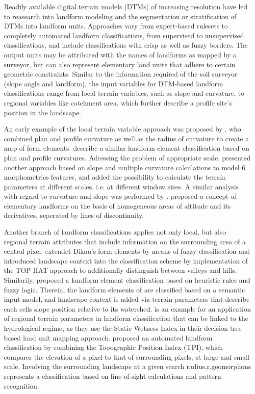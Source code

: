 \documentclass[final,1p,times,twocolumn,authoryear]{elsarticle}
\begin{document}
Readily available digital terrain models (DTMs) of increasing resolution have led to reasearch into landform modeling and the segmentation or stratification  of DTMs into landform units. Approaches vary from expert-based rulesets to completely automated landform classifications, from supervised to unsupervised classifications, and include classifications with crisp as well as fuzzy borders.  The output units may be attributed with the names of landforms as mapped by a surveyor, but can also represent elementary land units that adhere to certain geometric constraints. Similar to the information required of the soil surveyor (slope angle and landform), the input variables for DTM-based landform classifications range from local terrain variables, such as slope and curvature, to regional variables like catchment area, which further describe a profile site's position in the landscape.

An early example of the local terrain variable approach was  proposed by \cite{Dikau1988}, who  combined plan and profile curvature as well as the radius of curvature to create a map of form elements. \cite{Pennock1987} describe a similar landform element classification based on plan and profile curvatures. Adressing the problem of appropriate scale, \cite{Wood1996} presented another approach based on slope and multiple curvature calculations to model 6 morphometrics features, and added the possibility to calculate the terrain parameters at different scales, i.e. at different window sizes. A similar analysis with regard to curvature and slope was performed by \cite{Blaszczynski1997}.  \cite{Minar2008} proposed a concept of elementary landforms on the basis of homogeneous areas  of  altitude and its derivatives, seperated by lines of discontinuity.  

Another branch of landform classifications applies not only local, but also regional terrain attributes \citep{Gallant2000} that include information on the surrounding area of a central pixel. \cite{Schmidt2004} extendet Dikau's form elements by means of fuzzy classification and  introduced landscape context into the classification scheme by implementation of the TOP HAT approach \citep{Rodriguez2002} to additionally distinguish between valleys and hills.  Similarily, \cite{MacMillan2000a} proposed a landform element classification based on heuristic rules and fuzzy logic. Therein, the landform elements of \cite{Pennock1987} are classified based on a semantic input model, and landscape context is added via terrain parameters that describe each cells slope position relative to its watershed. \cite{Hollingsworth2006} is an example for an application of regional terrain parameters in landform classification that can be linked to the hydrological regime, as they use the Static Wetness Index in their decision tree based land unit mapping approach. \cite{Weiss2000} proposed an automated landform classification by combining the Topographic Position Index (TPI), which compares the elevation of a pixel to that of surrounding pixels, at large and small scale. Involving the surrounding landscape at a given search radius,r.geomorphons \citep{Jasiewicz2013} represents a classification based on line-of-sight calculations and pattern recognition.
\end{document}
